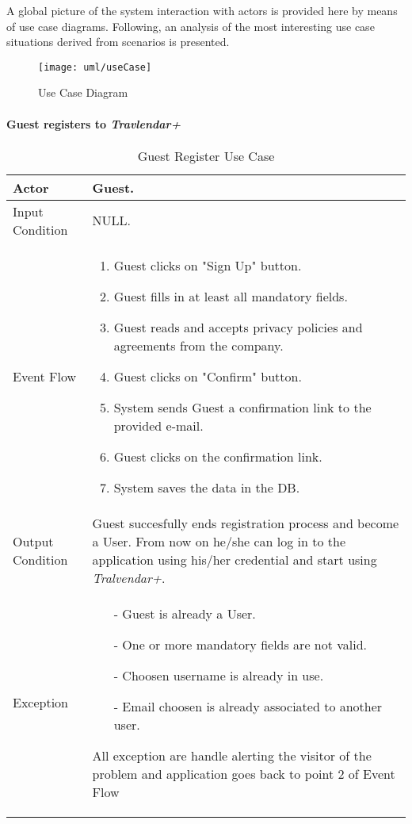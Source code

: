 A global picture of the system interaction with actors is provided here by means of use case diagrams. Following, an analysis of the most interesting use case situations derived from scenarios is presented.

	\begin{figure}[H]
		\centering
		\texttt{[image: uml/useCase]}
		\caption{Use Case Diagram}
	\end{figure}
	


	\paragraph{Guest registers to \textit{Travlendar+}}\label{register_useCase}
		\begin{table}[H]
			\begin{tabular}{| l | p{} | }
				\hline
				\hline
				Actor	&		Guest. \\
				\hline
				Input Condition		&		NULL. \\
				\hline
				Event Flow		&		\begin{enumerate}
													\item Guest clicks on "Sign Up" button.
													\item Guest fills in at least all mandatory fields.
													\item Guest reads and accepts privacy policies and agreements from the company.
													\item Guest clicks on "Confirm" button.
													\item System sends Guest a confirmation link to the provided e-mail.
													\item Guest clicks on the confirmation link.
													\item	 System saves the data in the DB.
												\end{enumerate} \\
				\hline
				Output Condition		&		Guest succesfully ends registration process and become a User. From now on he/she can log in to the application using his/her credential and start using \textit{Tralvendar+}. \\
				\hline		
				Exception		&		\begin{itemize}
												\item[-] Guest is already a User.
												\item[-] One or more mandatory fields are not valid.
												\item[-] Choosen username is already in use.
												\item[-] Email choosen is already associated to another user.
											\end{itemize}
											All exception are handle alerting the visitor of the problem and application goes back to point 2 of Event Flow \\
				\hline
				\hline
			\end{tabular}
			\caption{Guest Register Use Case}
		\end{table}

